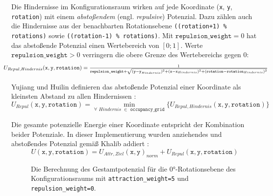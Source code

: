 Die Hindernisse im Konfigurationsraum wirken auf jede Koordinate (\texttt{x}, \texttt{y}, \texttt{rotation}) mit einem \textit{abstoßendem} (engl. \textit{repulsive}) Potenzial. Dazu zählen auch die Hindernisse aus der benachbarten Rotationsebene \texttt{((rotation+1) \% rotations)} sowie \texttt{((rotation-1) \% rotations)}. Mit $\texttt{repulsion\_weight}=0$ hat das abstoßende Potenzial einen Wertebereich von $[0;1]$. Werte $\texttt{repulsion\_weight} > 0 $ verringern die obere Grenze des Wertebereichs gegen $0$: \cite{schweiger.2023}
\vspace*{0.25cm}
\begin{equation*}
\hspace*{-0.075\linewidth}
\resizebox{1.15\linewidth}{!}{
  $ U_{Repul, Hindernis}(\texttt{x}, \texttt{y}, \texttt{rotation}) = \frac{1}{\texttt{repulsion\_weight} + \sqrt{(\texttt{y} - \texttt{y}_{Hindernis})^2 + (\texttt{x} - \texttt{x}_{Hindernis})^2 + (\texttt{rotation} - \texttt{rotation}_{Hindernis})^2}}
$}
\hspace*{-0.075\linewidth}
\end{equation*}

\vspace*{0.05cm}
Yujiang und Huilin definieren das abstoßende Potenzial einer Koordinate als kleinsten Abstand zu allen Hindernissen \cite{yujiang.2017}:
\vspace*{0.3cm}
\begin{equation*}
U_{Repul}(\texttt{x}, \texttt{y}, \texttt{rotation}) = \min_{\forall \,\,Hindernis \,\,\in \texttt{ occupancy\_grid}} \{ U_{Repul, Hindernis}(\texttt{x}, \texttt{y}, \texttt{rotation}) \}
\end{equation*}

Die gesamte potenzielle Energie einer Koordinate entspricht der Kombination beider Potenziale. In dieser Implementierung wurden anziehendes und abstoßendes Potenzial gemäß Khalib addiert \cite{khatib.1985}:
\vspace*{0.25cm}
\begin{equation*}
U(\texttt{x}, \texttt{y}, \texttt{rotation}) = U_{Attr, Ziel}(\texttt{x}, \texttt{y})_{norm} + U_{Repul}(\texttt{x}, \texttt{y}, \texttt{rotation})
\end{equation*}
\begin{figure}[H]
	\centering
	\footnotesize
	\centerline{}
	\caption{Die Berechnung des Gestamtpotenzial für die $0$°-Rotationsebene des Konfigurationsraums mit \texttt{attraction\_weight=5} und \texttt{repulsion\_weight=0}.}
\end{figure}


